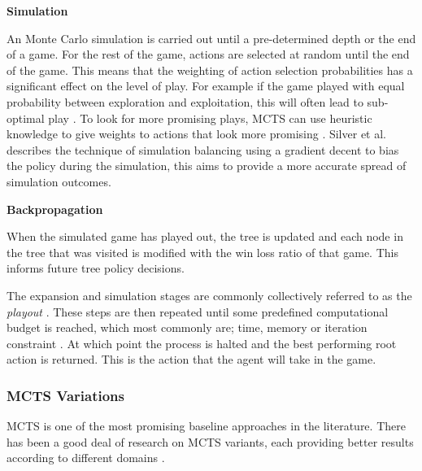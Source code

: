 \documentclass[journal]{IEEEtran}
\begin{document}
		\textbf{Simulation}
		
			An Monte Carlo simulation is carried out until a pre-determined depth or the end of a game.
			For the rest of the game, actions are selected at random until the end of the game. This means that the weighting of action selection probabilities has a significant effect on the level of play. For example if the game played with equal probability between exploration and exploitation, this will often lead to sub-optimal play \cite{chaslot2008monte}. 
			To look for more promising plays, MCTS can use heuristic knowledge to give weights to actions that look more promising \cite{perez2014solving}.
			Silver et al. \cite{silver2009monte} describes the technique of simulation balancing using a gradient decent to bias the policy during the simulation, this aims to provide a more accurate spread of simulation outcomes.

		\textbf{Backpropagation}
		
			When the simulated game has played out, the tree is updated and each node in the tree that was visited is modified with the win loss ratio of that game. This informs future tree policy decisions.
			
			The expansion and simulation stages are commonly collectively referred to as the \textit{playout} \cite{powley2014information}.
			These steps are then repeated until some predefined computational budget is reached, which most commonly are; time, memory or iteration constraint \cite{browne2012survey}. At which point the process is halted and the best performing root action is returned. This is the action that the agent will take in the game.


		


		\subsubsection{MCTS Variations} \label{sssec:MCTSvariations}
			MCTS is one of the most promising baseline approaches in the  literature.
			There has been a good deal of research on MCTS variants, each providing better results according to different domains \cite{browne2012survey, park2015mcts, perez2014knowledge, ilhan2017monte, de2016monte, frydenberg2015investigating}.
\end{document}
